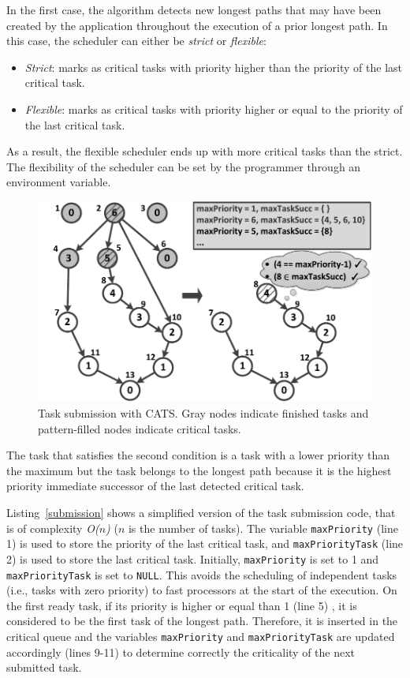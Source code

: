 In the first case, the algorithm detects new longest paths that may have been created by the application throughout the execution of a prior longest path. In this case, the scheduler can either be \textit{strict} or \textit{flexible}:
\begin{itemize}
 \item{\textit{Strict}: marks as critical tasks with priority higher than the priority of the last critical task.}
 \item{\textit{Flexible}: marks as critical tasks with priority higher or equal to the priority of the last critical task.} 
 \end{itemize}
As a result, the flexible scheduler ends up with more critical tasks than the strict. The flexibility of the scheduler can be set by the programmer through an environment variable.
\fi %
\begin{figure}[tl!]
\includegraphics[width=\columnwidth]{images/fig_2.pdf} 
\centering
\caption{Task submission with CATS. Gray nodes indicate finished tasks and pattern-filled nodes indicate critical tasks.}
\label{submitFig}
\vspace{-0.5cm}
\end{figure}
The task that satisfies the second condition is a task with a lower priority than the maximum but the task belongs to the longest path because it is the highest priority immediate successor of the last detected critical task. 

Listing~\ref{submission} shows a simplified version of the task submission code, that is of complexity \textit{O($n$)} (\textit{$n$} is the number of tasks). The variable \texttt{maxPriority} (line 1) is used to store the priority of the last critical task, and \texttt{maxPriorityTask} (line 2) is used to store the last critical task. Initially, \texttt{maxPriority} is set to 1 and \texttt{maxPriorityTask} is set to \texttt{NULL}. This avoids the scheduling of independent tasks (i.e., tasks with zero priority) to fast processors at the start of the execution. On the first ready task, if its priority is higher or equal than 1 (line 5) , it is considered to be the first task of the longest path. Therefore, it is inserted in the critical queue and the variables \texttt{maxPriority} and \texttt{maxPriorityTask} are updated accordingly (lines 9-11) to determine correctly the criticality of the next submitted task.

